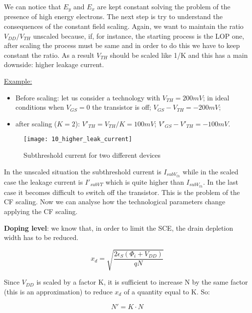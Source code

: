 \documentclass[a4paper, 12pt, twoside, openright]{report}
\begin{document}
\begin{enumerate}
We can notice that $E_{y}$ and $E_{x}$ are kept constant solving the problem of the presence of high energy electrons.
The next step is try to understand the consequences of the constant field scaling. Again, we want to maintain the ratio $V_{DD}/V_{TH}$ unscaled because, if, for instance, the starting process is the LOP one, after scaling the process must be same and in order to do this we have to keep constant the ratio. As a result $V_{TH}$ should be scaled like 1/K and this has a main downside: higher leakage current.


\underline{Example:}

	\begin{itemize}
	\item Before scaling: let us consider a technology with $V_{TH} = 200 mV$; in ideal conditions when $V_{GS} = 0$ the transistor is off; $V_{GS} - V_{TH} = -200 mV$;
	\item after scaling ($K = 2$): $V'_{TH} = V_{TH}/K = 100 mV$; $V'_{GS} - V'_{TH} = -100 mV$.
	\end{itemize}

	\begin{figure}[H]
	\centering
	\texttt{[image: 10\_higher\_leak\_current]}
	\caption{Subthreshold current for two different devices}
	\label{}
	\end{figure}

In the unscaled situation the subthreshold current is $I_{subV_{th}}$ while in the scaled case the leakage current is $I'_{subVT}$ which is quite higher than $I_{subV_{th}}$. In the last case it becomes difficult to switch off the transistor. This is the problem of the CF scaling.
Now we can analyse how the technological parameters change applying the CF scaling.

\textbf{Doping level}: we know that, in order to limit the SCE, the drain depletion width has to be reduced.

	\begin{equation}
	x_d=\sqrt{\frac{2\epsilon_S(\Phi_i+V_{DD})}{qN}}
	\end{equation}

Since $V_{DD}$ is scaled by a factor K, it is sufficient to increase N by the same factor (this is an approximation) to reduce $x_{d}$ of a quantity equal to K. So:

	\begin{equation}
	N' = K \cdot N
	\end{equation}


\end{enumerate}
\end{document}
